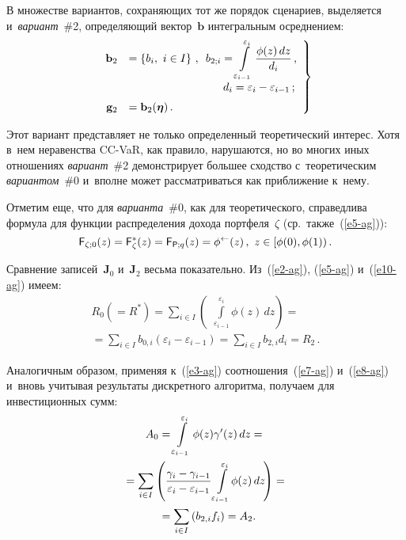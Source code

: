 \begin{multicols}{2}
  В множестве вариантов, сохраняющих тот же порядок сценариев, выделяется 
и~\textit{вариант}~\#2, определяющий вектор~$\mathbf{b}$ интегральным 
осреднением: 
  \begin{equation}
  \left.
  \begin{array}{rl}
  \mathbf{b}_2 &= \left\{ b_i,\ i\in I\right\}\,,\enskip 
  b_{2;i} =\displaystyle\int\limits^{\varepsilon_i}_{\varepsilon_{i-1}} 
\fr{\phi(z)\,dz}{d_i}\,,\\[6pt]
 &\hspace*{30mm}d_i=\varepsilon_i-\varepsilon_{i-1}\,;\\[6pt] 
\mathbf{g}_2&=\mathbf{b}_2(\boldsymbol{\eta})\,.
  \end{array}
  \right\}
  \label{e10-ag}
  \end{equation}
  
  Этот вариант представляет не только определенный теоретический интерес. 
Хотя в~нем неравенства CC-VaR, как правило, нарушаются, но во многих иных 
отношениях \textit{вариант}~\#2 демонстрирует большее сходство 
с~теоретическим \textit{вариантом}~\#0 и~вполне может рассматриваться как 
приближение к~нему.
  
  Отметим еще, что для \textit{варианта}~\#0, как для тео\-ре\-ти\-че\-ско\-го, 
справедлива формула для функции распределения дохода портфеля~$\zeta$ 
(ср.\ также~(\ref{e5-ag})):
  $$
  {\sf F}_{\zeta;0}(z)={\sf F}^*_{\zeta}(z) ={\sf F}_{{\sf 
P};q}(z)=\phi^{\leftarrow}(z)\,,\ z\in [\phi(0),\phi(1))\,.
  $$
  
  Сравнение записей~$\mathbf{J}_0$ и~$\mathbf{J}_2$ весьма показательно. 
Из~(\ref{e2-ag}), (\ref{e5-ag}) и~(\ref{e10-ag}) имеем:
  \begin{multline}
  R_0\left(=R^*\right) =\sum\limits_{i\in I}\left(\ \, \int\limits_{\varepsilon_{i-
1}}^{\varepsilon_i} \phi(z)\,dz\right) ={}\\
  {}=\sum\limits_{i\in I} b_{0,i}\left( \varepsilon_i -\varepsilon _{i-
1}\right)=\sum\limits_{i\in I} b_{2,i} d_i =R_2\,.
  \label{e11-ag}
  \end{multline}
  
  Аналогичным образом, применяя к~(\ref{e3-ag}) соотношения~(\ref{e7-ag}) 
и~(\ref{e8-ag}) и~вновь учитывая результаты дискретного алгоритма, получаем 
для инвестиционных сумм:
  \begin{multline}
  A_0=\int\limits_{\varepsilon_{i-1}}^{\varepsilon_i} \phi(z)\gamma^\prime(z)\,dz 
={}\\
{}=\sum\limits_{i\in I} \left( \displaystyle\frac{\displaystyle \gamma_i-\gamma_{i-1}\mathstrut}{\displaystyle \varepsilon_i - 
\varepsilon_{i-1}\mathstrut} \int\limits_{\varepsilon_{i-1}}^{\varepsilon_i} \!\phi(z)\,dz\!\right) 
={}\\
{}=\sum\limits_{i\in I} \left( b_{2,i} f_i\right) =A_2.\!\!
  \label{e12-ag}
  \end{multline}
  

\end{multicols}
